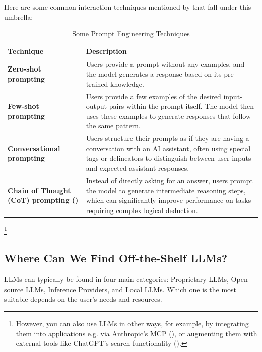 \documentclass{article} %
\begin{document}
Here are some common interaction techniques mentioned by \cite{Karpathy-2025}
that fall under this umbrella:
\begin{table}[h!]
\centering
\begin{tabular}{p{}p{}}
\toprule
\textbf{Technique} & \textbf{Description} \\
\midrule
\textbf{Zero-shot prompting} & Users provide a prompt without any examples, \newline 
    and the model generates a response based on its pre-trained knowledge. \\
\addlinespace
\textbf{Few-shot prompting} & Users provide a few examples of the desired input-output pairs \newline within the prompt itself.
The model then uses these examples \newline to generate responses that follow the same pattern. \\
\addlinespace
\textbf{Conversational prompting} & Users structure their prompts as if they are having a conversation \newline with an AI assistant,
often using special tags or delineators \newline to distinguish between user inputs and expected assistant responses. \\
\addlinespace
\textbf{Chain of Thought (CoT) prompting (\cite{Wei-et-al-2023})} & Instead of directly asking for an answer, users prompt the model \newline to generate intermediate reasoning steps,
which can significantly \newline improve performance on tasks requiring complex logical deduction. \\
\bottomrule
\end{tabular}
\caption{Some Prompt Engineering Techniques}
\label{tab:pe_tech}
\end{table}
\footnote{
    However, you can also use LLMs in other ways, for example,
    by integrating them into applications e.g. via Anthropic's MCP (\cite{Anthropic-2025}),
    or augmenting them with external tools like ChatGPT's search functionality (\cite{ChatGPT-2022}).
}

\subsection{Where Can We Find Off-the-Shelf LLMs?}

LLMs can typically be found in four main categories: Proprietary LLMs, Open-source LLMs, Inference Providers, and Local LLMs.
Which one is the most suitable depends on the user's needs and resources.
\end{document}
